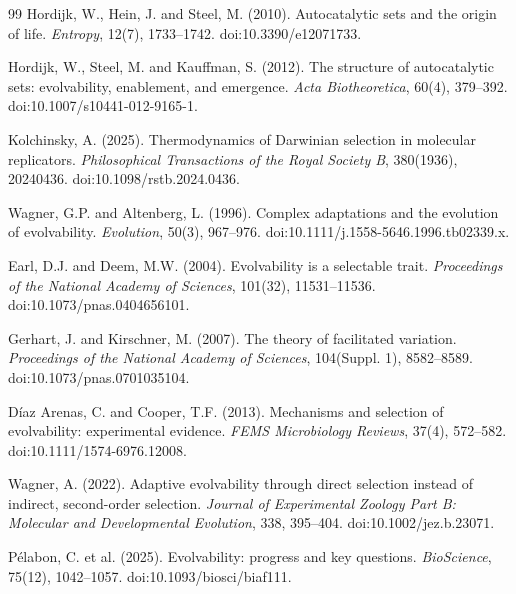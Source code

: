 \documentclass[11pt]{article}
\begin{document}
\begin{thebibliography}{99}
Hordijk, W., Hein, J. and Steel, M. (2010).
Autocatalytic sets and the origin of life.
\emph{Entropy}, 12(7), 1733--1742. doi:10.3390/e12071733.

Hordijk, W., Steel, M. and Kauffman, S. (2012).
The structure of autocatalytic sets: evolvability, enablement, and emergence.
\emph{Acta Biotheoretica}, 60(4), 379--392. doi:10.1007/s10441-012-9165-1.

Kolchinsky, A. (2025).
Thermodynamics of Darwinian selection in molecular replicators.
\emph{Philosophical Transactions of the Royal Society B}, 380(1936), 20240436. doi:10.1098/rstb.2024.0436.

Wagner, G.P. and Altenberg, L. (1996).
Complex adaptations and the evolution of evolvability.
\emph{Evolution}, 50(3), 967--976. doi:10.1111/j.1558-5646.1996.tb02339.x.

Earl, D.J. and Deem, M.W. (2004).
Evolvability is a selectable trait.
\emph{Proceedings of the National Academy of Sciences}, 101(32), 11531--11536. doi:10.1073/pnas.0404656101.

Gerhart, J. and Kirschner, M. (2007).
The theory of facilitated variation.
\emph{Proceedings of the National Academy of Sciences}, 104(Suppl. 1), 8582--8589. doi:10.1073/pnas.0701035104.

D\'iaz Arenas, C. and Cooper, T.F. (2013).
Mechanisms and selection of evolvability: experimental evidence.
\emph{FEMS Microbiology Reviews}, 37(4), 572--582. doi:10.1111/1574-6976.12008.

Wagner, A. (2022).
Adaptive evolvability through direct selection instead of indirect, second-order selection.
\emph{Journal of Experimental Zoology Part B: Molecular and Developmental Evolution}, 338, 395--404. doi:10.1002/jez.b.23071.

P\'elabon, C. et al. (2025).
Evolvability: progress and key questions.
\emph{BioScience}, 75(12), 1042--1057. doi:10.1093/biosci/biaf111.

\end{thebibliography}
\end{document}
